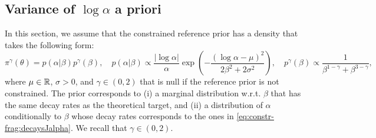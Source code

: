 \subsection{Variance of $\log\alpha$ a priori}
    \label{sec:var_prior_alpha}



In this section, we assume that the constrained reference prior has a density that takes the following form:
\begin{equation}
    \pi^\gamma(\theta) = p(\alpha|\beta)p^\gamma(\beta),\quad p(\alpha|\beta)\propto \frac{|\log\alpha|}{\alpha}\exp\left(-\frac{(\log\alpha-\mu)^2}{2\beta^2+2\sigma^2}\right),\quad p^\gamma(\beta) \propto\frac{1}{\beta^{1-\gamma}+\beta^{3-\gamma}},
\end{equation}
where $\mu\in\mathbb{R}$, $\sigma>0$, and $\gamma\in(0,2)$ that is null if the reference prior is not constrained.
The prior corresponds to (i) a marginal distribution w.r.t. $\beta$ that has the same decay rates as the theoretical target, and (ii) a distribution of $\alpha$ conditionally to $\beta$ whose decay rates corresponds to the ones in \cref{eq:constr-frag:decaysJalpha}.
We recall that $\gamma\in(0,2)$.




